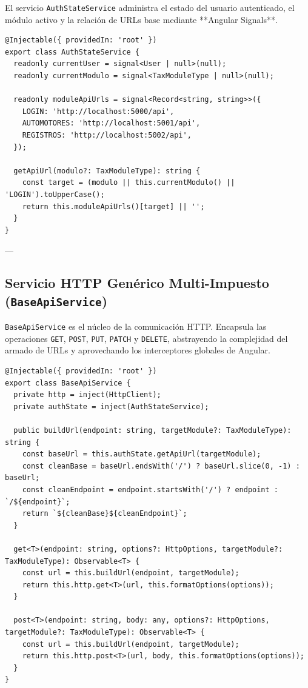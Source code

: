 \documentclass[12pt,a4paper]{article}
\begin{document}
El servicio \texttt{AuthStateService} administra el estado del usuario autenticado, el módulo activo y la relación de URLs base mediante **Angular Signals**.

\begin{lstlisting}[caption={Fragmento del AuthStateService (Signals reactivos)}]
@Injectable({ providedIn: 'root' })
export class AuthStateService {
  readonly currentUser = signal<User | null>(null);
  readonly currentModulo = signal<TaxModuleType | null>(null);

  readonly moduleApiUrls = signal<Record<string, string>>({
    LOGIN: 'http://localhost:5000/api',
    AUTOMOTORES: 'http://localhost:5001/api',
    REGISTROS: 'http://localhost:5002/api',
  });

  getApiUrl(modulo?: TaxModuleType): string {
    const target = (modulo || this.currentModulo() || 'LOGIN').toUpperCase();
    return this.moduleApiUrls()[target] || '';
  }
}
\end{lstlisting}

---

\subsection{Servicio HTTP Genérico Multi-Impuesto (\texttt{BaseApiService})}

\texttt{BaseApiService} es el núcleo de la comunicación HTTP. Encapsula las operaciones \texttt{GET}, \texttt{POST}, \texttt{PUT}, \texttt{PATCH} y \texttt{DELETE}, abstrayendo la complejidad del armado de URLs y aprovechando los interceptores globales de Angular.

\begin{lstlisting}[caption={Servicio HTTP Genérico BaseApiService}]
@Injectable({ providedIn: 'root' })
export class BaseApiService {
  private http = inject(HttpClient);
  private authState = inject(AuthStateService);

  public buildUrl(endpoint: string, targetModule?: TaxModuleType): string {
    const baseUrl = this.authState.getApiUrl(targetModule);
    const cleanBase = baseUrl.endsWith('/') ? baseUrl.slice(0, -1) : baseUrl;
    const cleanEndpoint = endpoint.startsWith('/') ? endpoint : `/${endpoint}`;
    return `${cleanBase}${cleanEndpoint}`;
  }

  get<T>(endpoint: string, options?: HttpOptions, targetModule?: TaxModuleType): Observable<T> {
    const url = this.buildUrl(endpoint, targetModule);
    return this.http.get<T>(url, this.formatOptions(options));
  }

  post<T>(endpoint: string, body: any, options?: HttpOptions, targetModule?: TaxModuleType): Observable<T> {
    const url = this.buildUrl(endpoint, targetModule);
    return this.http.post<T>(url, body, this.formatOptions(options));
  }
}
\end{lstlisting}
\end{document}
